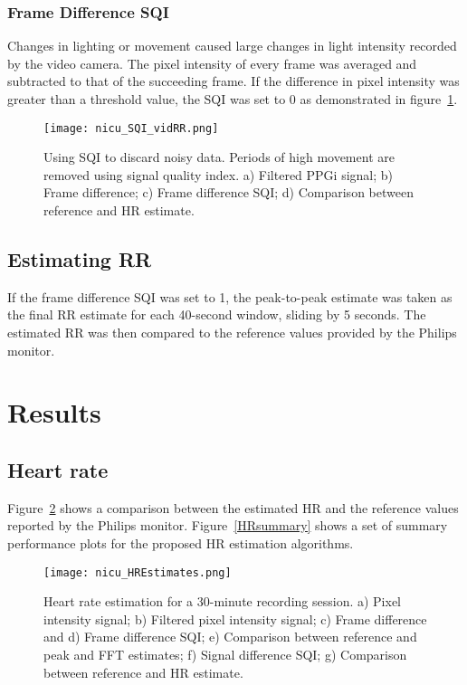 \subsubsection{Frame Difference SQI}
 Changes in lighting or movement caused large changes in light intensity recorded by the video camera. The pixel intensity of every frame was averaged and subtracted to that of the succeeding frame. If the difference in pixel intensity was greater than a threshold value, the SQI was set to 0 as demonstrated in figure~\ref{SQI_vidRR}.
 
 \begin{center}
\begin{figure}[H]
    \centering
\texttt{[image: nicu\_SQI\_vidRR.png]}
    \caption[Using SQI to discard noisy data. Periods of high movement are removed using signal quality index.]{Using SQI to discard noisy data. Periods of high movement are removed using signal quality index. a) Filtered PPGi signal; b) Frame difference; c) Frame difference SQI; d) Comparison between reference and HR estimate.}
    \label{SQI_vidRR}
\end{figure}
\end{center}

 \subsection{Estimating RR}
If the frame difference SQI was set to 1, the peak-to-peak estimate was taken as the final RR estimate for each 40-second window, sliding by 5 seconds. The estimated RR was then compared to the reference values provided by the Philips monitor.

\vspace{50em}
\section{Results}
 \subsection{Heart rate}
Figure~\ref{HRresults} shows a comparison between the estimated HR and the reference values reported by the Philips monitor. Figure~\ref{HRsummary} shows a set of summary performance plots for the proposed HR estimation algorithms.
 
\begin{center}
\begin{figure}[H]
\centering
\texttt{[image: nicu\_HREstimates.png]}
    \caption[Heart rate estimation for a 30-minute recording session.] {Heart rate estimation for a 30-minute recording session. a) Pixel intensity signal; b) Filtered pixel intensity signal; c) Frame difference and d) Frame difference SQI; e) Comparison between reference and peak and FFT estimates; f) Signal difference SQI; g) Comparison between reference and HR estimate.}
     \label{HRresults}
    \end{figure}
 \end{center}
 
